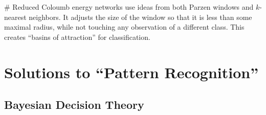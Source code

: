 \documentclass[12pt, a4paper]{article}
\begin{document}
\begin{easylist}[itemize]
# Reduced Coloumb energy networks use ideas from both Parzen windows and $k$-nearest neighbors.
It adjusts the size of the window so that it is less than some maximal radius, while not touching any observation of a different class.
This creates ``basins of attraction'' for classification.

\end{easylist}





\clearpage
\section{Solutions to ``Pattern Recognition''}

\setcounter{subsection}{1}
\subsection{Bayesian Decision Theory}
\end{document}
